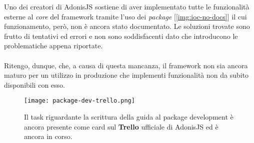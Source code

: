     Uno dei creatori di AdonisJS sostiene di aver implementato tutte le funzionalità esterne al \textit{core} del framework tramite l'uso dei \textit{package} [\autoref{img:ioc-no-docs}] il cui funzionamento, però, non è ancora stato documentato. Le soluzioni trovate sono frutto di tentativi ed errori e non sono soddisfacenti dato che introducono le problematiche appena riportate.
    \\\\
    Ritengo, dunque, che, a causa di questa mancanza, il framework non sia ancora maturo per un utilizzo in produzione che implementi funzionalità non da subito disponibili con esso.

    \begin{figure}[h!]
        \centering
        \texttt{[image: package-dev-trello.png]}
        \caption[Card Trello package development AdonisJS]{Il task riguardante la scrittura della guida al package development è ancora presente come card sul \textbf{Trello} ufficiale di AdonisJS ed è ancora in corso.}
        \label{img:ioc-no-docs}
    \end{figure}
